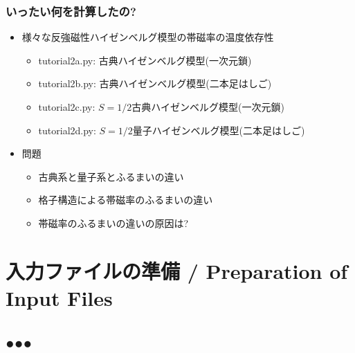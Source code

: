 \begin{frame}[t,fragile]
  \frametitle{いったい何を計算したの?}
  \begin{itemize}
  \item 様々な反強磁性ハイゼンベルグ模型の帯磁率の温度依存性
    \begin{itemize}
    \item tutorial2a.py: 古典ハイゼンベルグ模型(一次元鎖)
    \item tutorial2b.py: 古典ハイゼンベルグ模型(二本足はしご)
    \item tutorial2c.py: $S=1/2$古典ハイゼンベルグ模型(一次元鎖)
    \item tutorial2d.py: $S=1/2$量子ハイゼンベルグ模型(二本足はしご)
    \end{itemize}
  \item 問題
    \begin{itemize}
      \item 古典系と量子系とふるまいの違い
      \item 格子構造による帯磁率のふるまいの違い
      \item 帯磁率のふるまいの違いの原因は?
    \end{itemize}
  \end{itemize}
\end{frame}

\section{入力ファイルの準備 / Preparation of Input Files}
\subsection*{{\protect\color{red}●}{\protect\color{blue}●}{\protect\color{green}●}}

